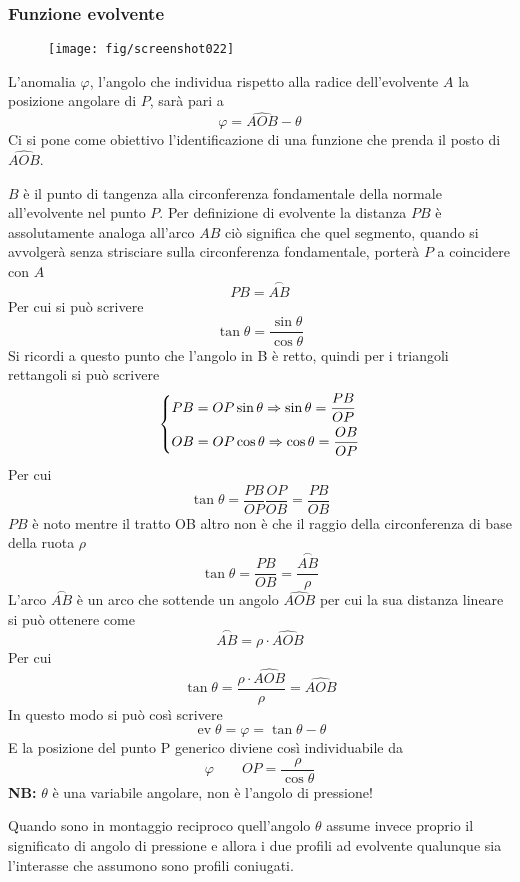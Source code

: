 \documentclass[a4paper, 15pt]{article}
\DeclareMathOperator{\ev}{ev}
\begin{document}
\subsubsection{Funzione evolvente}
\begin{adjustwidth}{2in}{}		
		\begin{figure}[H]
			\centering
			\texttt{[image: fig/screenshot022]}
			\label{fig:screenshot022_bis}
		\end{figure}
		L'anomalia $\varphi$, l'angolo che individua rispetto alla radice dell'evolvente $A$  la posizione angolare di $P$, sarà pari a
		\[\varphi = \hat{AOB}-\theta\]		
		Ci si pone come obiettivo l'identificazione di una funzione che prenda il posto di $\hat{AOB}$.\newline
		
		$B$ è il punto di tangenza alla circonferenza fondamentale della normale all'evolvente nel punto $P$.		
		Per definizione di evolvente la distanza $PB$ è assolutamente analoga all'arco $AB$ ciò significa che quel segmento, quando si avvolgerà senza strisciare sulla circonferenza fondamentale, porterà $P$ a coincidere con $A$
		\[PB=\overset{\frown}{AB}\]
		Per cui si può scrivere 
		\[\tan\theta = \dfrac{\sin\theta}{\cos\theta} \]
		Si ricordi a questo punto che l'angolo in B è retto, quindi per i triangoli rettangoli si può scrivere 
		\[\begin{dcases}
			PB = OP\sin\theta \Rightarrow \sin\theta = \dfrac{PB}{OP} \\
			OB = OP\cos\theta \Rightarrow \cos\theta = \dfrac{OB}{OP}
		\end{dcases}\]
		Per cui
		\[\tan\theta = \dfrac{PB}{OP}\dfrac{OP}{OB} = \dfrac{PB}{OB} \]
		$PB$ è noto mentre il tratto OB altro non è che il raggio della circonferenza di base della ruota $\rho$ 
		\[\tan\theta = \dfrac{PB}{OB}  = \dfrac{\overset{\frown}{AB}}{\rho}\]
		L'arco $\overset{\frown}{AB}$ è un arco che sottende un angolo $\hat{AOB}$ per cui la sua distanza lineare si può ottenere come 		
		\[\overset{\frown}{AB} = \rho\cdot\hat{AOB}\]
		Per cui
		\[\tan\theta = \dfrac{\rho\cdot\hat{AOB}}{\rho} = \hat{AOB}\]
		In questo modo si può così scrivere 
		\[\ev\theta=\varphi=\tan\theta-\theta\]
		E la posizione del punto P generico diviene così individuabile da 
		\[\varphi \qquad OP = \dfrac{\rho}{\cos\theta}\]
		\textbf{NB:} $\theta$ è una variabile angolare, non è l'angolo di pressione! \newline
		
		Quando sono in montaggio reciproco quell'angolo $\theta$ assume invece proprio il significato di angolo di pressione e allora i due profili ad evolvente qualunque sia l'interasse che assumono sono profili coniugati.
		

\end{adjustwidth}
\end{document}
